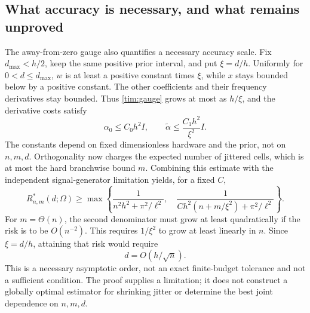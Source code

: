 \documentclass[11pt,a4paper]{article}
\numberwithin{equation}{section}
\theoremstyle{remark}
\begin{document}
\subsection{What accuracy is necessary, and what remains unproved}

The away-from-zero gauge also quantifies a necessary accuracy scale. Fix
$d_{\max}<h/2$, keep the same positive prior interval, and put $\xi=d/h$.
Uniformly for $0<d\le d_{\max}$, $w$ is at least a positive constant times
$\xi$, while $x$ stays bounded below by a positive constant. The other
coefficients and their frequency derivatives stay bounded. Thus
\eqref{tim:gauge} grows at most as $h/\xi$, and the derivative costs satisfy
\begin{equation}
 \alpha_0\le C_0h^2I,
 \qquad \widetilde\alpha\le\frac{C_1h^2}{\xi^2}I.
\end{equation}
The constants depend on fixed dimensionless hardware and the prior, not on
$n,m,d$. Orthogonality now charges the expected number of jittered cells,
which is at most the hard branchwise bound $m$. Combining this estimate with
the independent signal-generator limitation yields, for a fixed $C$,
\begin{equation}
 R^*_{n,m}(d;\Omega)\ge
 \max\left\{
 \frac1{n^2h^2+\pi^2/\ell^2},\quad
 \frac1{Ch^2(n+m/\xi^2)+\pi^2/\ell^2}
 \right\}.
 \label{tim:shrinking-bound}
\end{equation}
For $m=\Theta(n)$, the second denominator must grow at least quadratically
if the risk is to be $O(n^{-2})$. This requires $1/\xi^2$ to grow
at least linearly in $n$. Since $\xi=d/h$, attaining that risk would require
\begin{equation}
 d=O(h/\sqrt n).
\end{equation}
This is a necessary asymptotic order, not an exact finite-budget tolerance
and not a sufficient condition. The proof supplies a limitation; it does not
construct a globally optimal estimator for shrinking jitter or determine the
best joint dependence on $n,m,d$.
\end{document}

